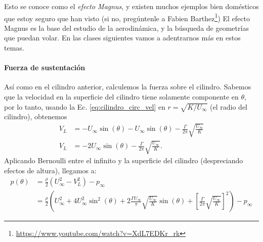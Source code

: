 Esto se conoce como el \emph{efecto Magnus}, y existen muchos ejemplos bien domésticos que estoy seguro que han visto (si no, pregúntenle a Fabien Barthez\footnote{\url{https://www.youtube.com/watch?v=XdL7EDKr_rk}})
El efecto Magnus es la base del estudio de la aerodinámica, y la búsqueda de geometrías que puedan volar.
En las clases siguientes vamos a adentrarnos más en estos temas.

\paragraph*{Fuerza de sustentación}
Así como en el cilindro anterior, calculemos la fuerza sobre el cilindro.
Sabemos que la velocidad en la superficie del cilindro tiene solamente componente en $\theta$, por lo tanto, usando la Ec. \eqref{eq:cilindro_circ_vel} en $r=\sqrt{K/U_\infty}$ (el radio del cilindro), obtenemos
%
\begin{align}\label{eq:cilindro_vel_superficie}
V_L &= -U_\infty\sin(\theta) - U_\infty\sin(\theta) - \frac{\Gamma}{2\pi}\sqrt{\frac{U_\infty}{K}}\nonumber\\
V_L &= -2U_\infty\sin(\theta) - \frac{\Gamma}{2\pi}\sqrt{\frac{U_\infty}{K}}.
\end{align}
%
Aplicando Bernoulli entre el infinito y la superficie del cilindro (despreciando efectos de altura), llegamos a:
%
\begin{align}\label{eq:cilindro_circ_p}
p(\theta) &= \frac{\rho}{2}\left(U_\infty^2-V_L^2\right) - p_\infty \nonumber\\
&= \frac{\rho}{2}\left(U_\infty^2+4U_\infty^2\sin^2(\theta) + 2\frac{\Gamma U_\infty}{\pi}\sqrt{\frac{U_\infty}{K}}\sin(\theta) + \left[\frac{\Gamma}{2\pi}\sqrt{\frac{U_\infty}{K}}\right]^2\right) - p_\infty
\end{align}

